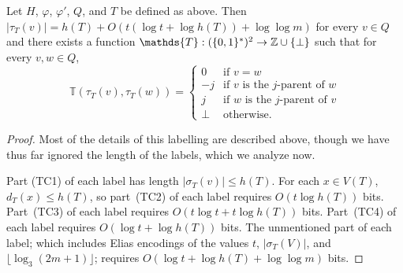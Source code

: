 \documentclass[kpfonts]{patmorin}
\let\le\leqslant
\begin{document}
\begin{lem}
  Let $H$, $\varphi$, $\varphi'$, $Q$, and $T$ be defined as above.  Then $|\tau_{T}(v)|=h(T) + O(t(\log t + \log h(T))+\log\log m)$ for every $v\in Q$  and there exists a function $\mathds{T}:(\{0,1\}^*)^2\to \Z\cup\{\perp\}$ such that  for every $v,w\in Q$,
  \[
      \mathds{T}(\tau_{T}(v),\tau_{T}(w)) = \begin{cases}
      0 & \text{if $v=w$} \\
      -j & \text{if $v$ is the $j$-parent of $w$} \\
      j & \text{if $w$ is the $j$-parent of $v$} \\
      \perp & \text{otherwise.}
    \end{cases}
  \]
\end{lem}

\begin{proof}
  Most of the details of this labelling are described above, though we have thus far ignored the length of the labels, which we analyze now.

  Part (TC1) of each label has length $|\sigma_T(v)|\le h(T)$.  For each $x\in V(T)$, $d_T(x)\le h(T)$, so part~(TC2) of each label requires $O(t\log h(T))$ bits.  Part~(TC3) of each label requires $O(t\log t + t\log h(T))$ bits.  Part~(TC4) of each label requires $O(\log t + \log h(T))$ bits.
  The unmentioned part of each label; which includes Elias encodings of the values $t$, $|\sigma_T(V)|$, and $\lfloor\log_3(2m+1)\rfloor$; requires $O(\log t+\log h(T) + \log\log m)$ bits.
\end{proof}

%
\end{document}
